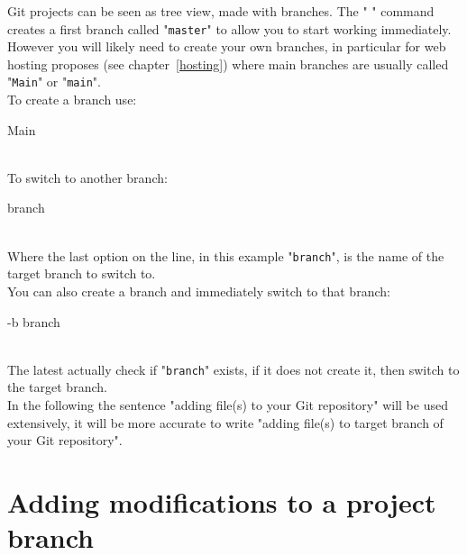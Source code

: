 Git projects can be seen as tree view, made with branches. The " " command creates a first branch called "\texttt{master}" 
to allow you to start working immediately. 
However you will likely need to create your own branches, in particular for web hosting proposes (see chapter~\ref{hosting})
where main branches are usually called "\texttt{Main}" or "\texttt{main}". \\[0.25cm]
To create a branch use: 
\begin{script}
    Main
\end{script} \\[-0.75cm]
\noindent To switch to another branch: 
\begin{script}
   branch
\end{script} \\[-0.75cm]
\noindent Where the last option on the line, in this example "\texttt{branch}", is the name of the target branch to switch to. \\
You can also create a branch and immediately switch to that branch:
\begin{script}
   -b branch
\end{script} \\[-0.75cm]
\noindent The latest actually check if "\texttt{branch}" exists, if it does not create it, then switch to the target branch. \\
In the following the sentence "adding file(s) to your Git repository" will be used extensively, it will be more accurate to write 
"adding file(s) to target branch of your Git repository". 

\section{Adding modifications to a project branch}

